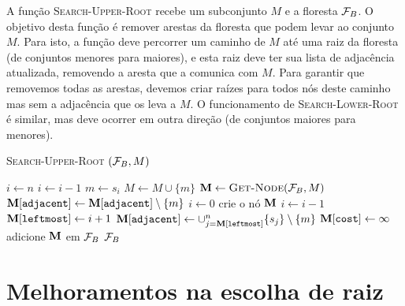 A função \textsc{Search-Upper-Root} recebe um subconjunto $M$ e a 
floresta $\mathcal{F}_B$. O objetivo desta função é remover arestas da 
floresta que podem levar ao conjunto $M$. Para isto, a função deve 
percorrer um caminho de $M$ até uma raiz da floresta (de conjuntos 
menores para maiores), e esta raiz deve ter sua lista de adjacência 
atualizada, removendo a aresta que a comunica com $M$. Para garantir que 
removemos todas as arestas, devemos criar raízes para todos nós deste 
caminho mas sem a adjacência que os leva a $M$. O funcionamento de 
\textsc{Search-Lower-Root} é similar, mas deve ocorrer em outra direção
(de conjuntos maiores para menores).

\begin{algorithm}[H]
\textsc{Search-Upper-Root} $(\mathcal{F}_B, M)$
\begin{algorithmic}[1]
    \State $i \gets n$
        \State $i \gets i - 1$
    \EndWhile
        \State $m \gets s_i$
        \State $M \gets M \cup \{m\}$
        \State $\mathbf M \gets {\normalfont\textsc{Get-Node}} (\mathcal{F}_B, M)$
            \State $\mathbf M[\texttt{adjacent}] \gets \mathbf M[\texttt{adjacent}] \setminus \{m\} $
            \State $i \gets 0$
        \Else
            \State crie o nó $\mathbf M$
                \State $i \gets i - 1$
            \EndWhile
            \State $\mathbf M[\texttt{leftmost}] \gets i + 1$
            \State $\mathbf M[\texttt{adjacent}] \gets \cup_{j = \mathbf M[\texttt{leftmost}]}^{n} \{s_j\} \setminus \{m\} $
            \State $\mathbf M[\texttt{cost}] \gets \infty$
            \State adicione $\mathbf M$ em $\mathcal{F}_B$
        \EndIf
        \Return $\mathcal{F}_B$
    \EndWhile
\end{algorithmic}
\end{algorithm}

\section{Melhoramentos na escolha de raiz}


